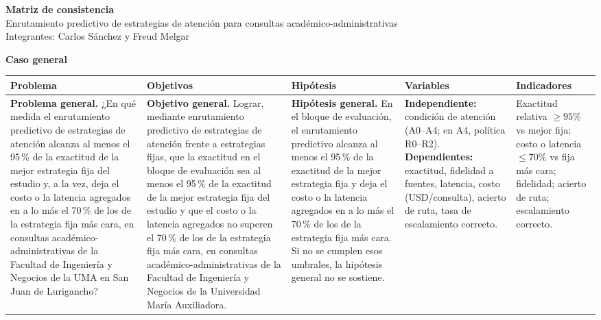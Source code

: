 \documentclass[10pt,a4paper,landscape]{article}
\begin{document}

\begin{center}
{\Large\bfseries Matriz de consistencia}\\[0.28em]
{\normalsize Enrutamiento predictivo de estrategias de atención para consultas académico-administrativas}\\[0.18em]
{\small Integrantes: Carlos Sánchez y Freud Melgar}
\end{center}

\vspace{0.3em}
\noindent\textbf{\small Caso general}\\[0.18em]
{\scriptsize
\setlength{\tabcolsep}{3pt}
\renewcommand{\arraystretch}{1.3}
\begin{tabularx}{\linewidth}{|Y|Y|Y|Y|Y|}
\hline
\textbf{\footnotesize Problema} & \textbf{\footnotesize Objetivos} & \textbf{\footnotesize Hipótesis} & \textbf{\footnotesize Variables} & \textbf{\footnotesize Indicadores} \\
\hline
\textbf{Problema general.} ¿En qué medida el enrutamiento predictivo de estrategias de atención alcanza al menos el 95\,\% de la exactitud de la mejor estrategia fija del estudio y, a la vez, deja el costo o la latencia agregados en a lo más el 70\,\% de los de la estrategia fija más cara, en consultas académico-administrativas de la Facultad de Ingeniería y Negocios de la UMA en San Juan de Lurigancho? &
\textbf{Objetivo general.} Lograr, mediante enrutamiento predictivo de estrategias de atención frente a estrategias fijas, que la exactitud en el bloque de evaluación sea al menos el 95\,\% de la exactitud de la mejor estrategia fija del estudio y que el costo o la latencia agregados no superen el 70\,\% de los de la estrategia fija más cara, en consultas académico-administrativas de la Facultad de Ingeniería y Negocios de la Universidad María Auxiliadora. &
\textbf{Hipótesis general.} En el bloque de evaluación, el enrutamiento predictivo alcanza al menos el 95\,\% de la exactitud de la mejor estrategia fija y deja el costo o la latencia agregados en a lo más el 70\,\% de los de la estrategia fija más cara. Si no se cumplen esos umbrales, la hipótesis general no se sostiene. &
\textbf{Independiente:} condición de atención (A0--A4; en A4, política R0--R2). \textbf{Dependientes:} exactitud, fidelidad a fuentes, latencia, costo (USD/consulta), acierto de ruta, tasa de escalamiento correcto. &
Exactitud relativa $\geq 95\%$ vs mejor fija; costo o latencia $\leq 70\%$ vs fija más cara; fidelidad; acierto de ruta; escalamiento correcto. \\
\hline
\end{tabularx}
}
\end{document}
